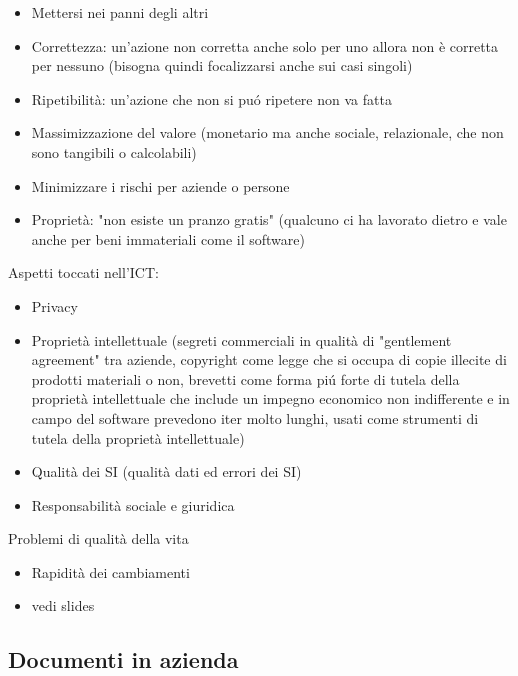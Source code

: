 \begin{itemize}

\item
  Mettersi nei panni degli altri
\item
  Correttezza: un'azione non corretta anche solo per uno allora non \`e
  corretta per nessuno (bisogna quindi focalizzarsi anche sui casi
  singoli)
\item
  Ripetibilit\`a: un'azione che non si pu\'o ripetere non va fatta
\item
  Massimizzazione del valore (monetario ma anche sociale, relazionale,
  che non sono tangibili o calcolabili)
\item
  Minimizzare i rischi per aziende o persone
\item
  Propriet\`a: "non esiste un pranzo gratis" (qualcuno ci ha lavorato
  dietro e vale anche per beni immateriali come il software)
\end{itemize}

Aspetti toccati nell'ICT:

\begin{itemize}

\item
  Privacy
\item
  Propriet\`a intellettuale (segreti commerciali in qualit\`a di
  "gentlement agreement" tra aziende, copyright come legge che si
  occupa di copie illecite di prodotti materiali o non, brevetti come
  forma pi\'u forte di tutela della propriet\`a intellettuale che include un
  impegno economico non indifferente e in campo del software prevedono
  iter molto lunghi, usati come strumenti di tutela della propriet\`a
  intellettuale)
\item
  Qualit\`a dei SI (qualit\`a dati ed errori dei SI)
\item
  Responsabilit\`a sociale e giuridica
\end{itemize}

Problemi di qualit\`a della vita

\begin{itemize}

\item
  Rapidit\`a dei cambiamenti
\item
  vedi slides
\end{itemize}

\subsection{Documenti in azienda}

